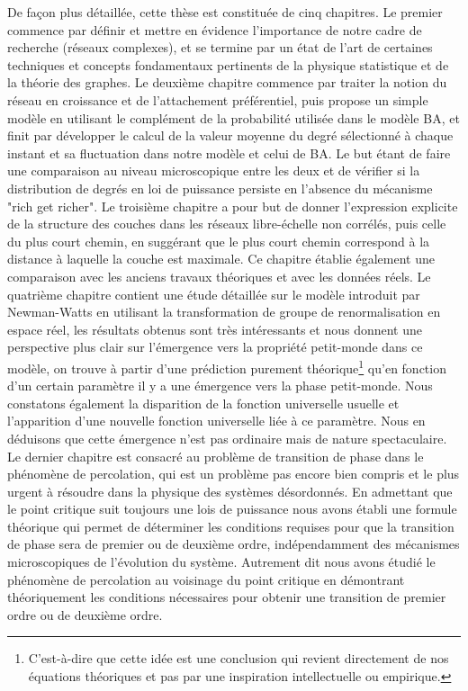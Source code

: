 De façon plus détaillée, cette thèse est constituée de cinq chapitres. Le premier commence par définir et mettre en évidence l'importance de notre cadre de recherche (réseaux complexes), et se termine par un état de l'art de  certaines techniques et concepts fondamentaux pertinents de la physique statistique et de la théorie des graphes. Le deuxième chapitre commence par traiter la notion du réseau en croissance et de l'attachement préférentiel, puis propose un simple modèle en utilisant le complément de la probabilité utilisée dans le modèle BA, et finit par développer le calcul de la valeur moyenne du degré sélectionné à chaque instant et sa fluctuation dans notre modèle et celui de BA. Le but étant de faire une comparaison au niveau microscopique entre les deux et de vérifier si la distribution de degrés en loi de puissance persiste en l'absence du mécanisme "rich get richer". Le troisième chapitre a pour but de donner l'expression explicite de la structure des couches dans les réseaux libre-échelle non corrélés, puis celle du plus court chemin, en suggérant que le plus court chemin correspond à la distance à laquelle la couche est maximale. Ce chapitre établie également une comparaison avec les anciens travaux théoriques et avec les données réels. Le quatrième chapitre contient une étude détaillée sur le modèle introduit par Newman-Watts en utilisant la transformation de groupe de renormalisation en espace réel, les résultats obtenus sont très intéressants et nous donnent une  perspective plus clair sur l'émergence vers la propriété petit-monde dans ce modèle, on trouve à partir d'une prédiction purement théorique\footnote{ 
C'est-à-dire que cette idée est une conclusion qui revient directement de nos équations théoriques et pas par une inspiration intellectuelle ou empirique.} qu'en fonction d'un certain paramètre il y a une émergence vers la phase petit-monde. Nous constatons également la disparition de la fonction universelle usuelle   et l'apparition d'une nouvelle fonction universelle liée à ce paramètre. Nous en déduisons que cette émergence n'est pas ordinaire mais de nature spectaculaire. Le dernier chapitre est consacré au problème de transition de phase dans le phénomène de percolation,  qui est un problème pas encore bien compris et le plus urgent à résoudre dans la physique des systèmes désordonnés. En admettant que le point critique suit toujours une lois de puissance nous avons établi une formule théorique qui permet de déterminer les conditions requises pour que la transition de phase sera de premier ou de deuxième ordre, indépendamment des mécanismes microscopiques de l'évolution du système. Autrement dit nous avons étudié le phénomène de percolation au voisinage du point critique en démontrant théoriquement les conditions nécessaires pour obtenir une transition de premier ordre ou de deuxième ordre.\\


